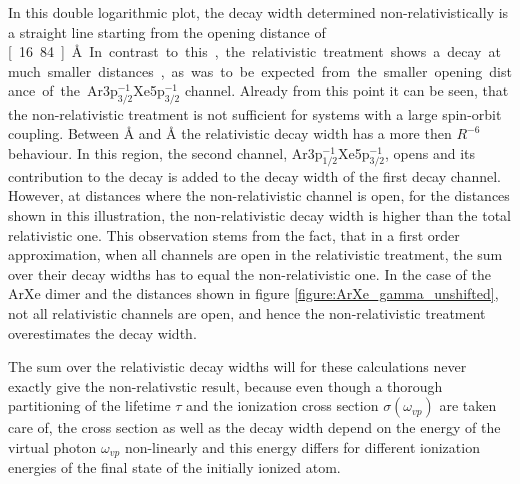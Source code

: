 In this double logarithmic plot, the decay width determined non-relativistically
is a straight line starting
from the opening distance of \unit[16.84]{\AA}.
In contrast to this, the relativistic treatment shows a decay at much smaller
distances, as was to be expected from the smaller opening distance of the
Ar3p$_{3/2}^{-1}$Xe5p$_{3/2}^{-1}$ channel. Already from this point it
can be seen, that the non-relativistic treatment is not sufficient for systems
with a large spin-orbit coupling. Between \unit[12]{\AA} and
\unit[13]{\AA} the relativistic decay width has a more then $R^{-6}$ behaviour.
In this region, the second channel, Ar3p$_{1/2}^{-1}$Xe5p$_{3/2}^{-1}$, opens
and its contribution to the decay is added to the decay width of the first
decay channel. However, at distances where the non-relativistic channel is open,
for the distances shown in this illustration, the non-relativistic decay width
is higher than the total relativistic one. This observation stems from the fact,
that in a first order approximation, when all channels are open in the relativistic
treatment, the sum over their decay widths has to equal the non-relativistic one.
In the case of the ArXe dimer and the distances shown in figure
\ref{figure:ArXe_gamma_unshifted}, not all relativistic channels are open, and
hence the non-relativistic treatment overestimates the decay width.

The sum over the relativistic decay widths will for these calculations never
exactly give the non-relativstic result, because even though a thorough
partitioning of the lifetime $\tau$ and the ionization cross section
$\sigma(\omega_{vp})$ are taken care of, the cross section as well as the decay
width depend on the energy of the virtual photon $\omega_{vp}$ non-linearly and this
energy differs for different ionization energies of the final state of the
initially ionized atom.
